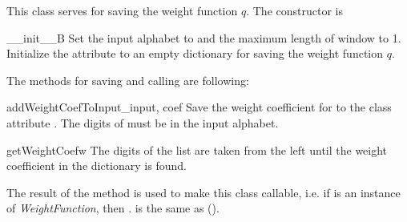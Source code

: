 This class serves for saving the weight function $q$. The constructor is

\begin{method}{\_\_init\_\_}{B}
Set the input alphabet to  and the maximum length of window to 1. Initialize the attribute  to an empty dictionary for saving the weight function $q$. 
\end{method}

The methods for saving and calling are following:

\begin{method}{addWeightCoefToInput}{\_input, coef}
Save the weight coefficient  for  to the class attribute . The digits of  must be in the input alphabet.
\end{method}

\begin{method}{getWeightCoef}{w}
The digits of the list  are taken from the left until the weight coefficient in the dictionary  is found. 
\end{method}

The result of the method  is used to make this class callable, i.e. if  is an instance of \emph{WeightFunction}, then . is the same as ().




